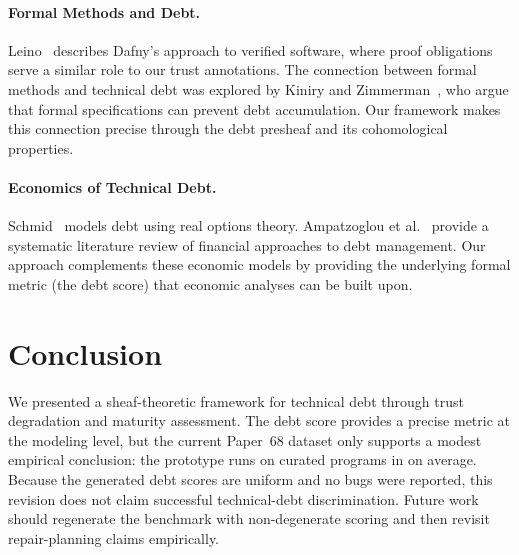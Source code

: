 \documentclass[11pt]{article}
\begin{document}
\paragraph{Formal Methods and Debt.}
Leino~\cite{Leino2010} describes Dafny's approach to verified
software, where proof obligations serve a similar role to our trust
annotations.  The connection between formal methods and technical debt
was explored by Kiniry and Zimmerman~\cite{Kiniry2008}, who argue
that formal specifications can prevent debt accumulation.  Our
framework makes this connection precise through the debt presheaf
and its cohomological properties.

\paragraph{Economics of Technical Debt.}
Schmid~\cite{Schmid2013} models debt using real options theory.
Ampatzoglou et al.~\cite{Ampatzoglou2015} provide a systematic
literature review of financial approaches to debt management.  Our
approach complements these economic models by providing the
underlying formal metric (the debt score) that economic analyses
can be built upon.


\section{Conclusion}\label{sec:conclusion}

We presented a sheaf-theoretic framework for technical debt through
trust degradation and maturity assessment.  The debt score provides
a precise metric at the modeling level, but the current Paper~68 dataset only
supports a modest empirical conclusion: the prototype runs on
\ppLXVIIIprogramCount{} curated programs in \ppLXVIIItimeMean{} on average.
Because the generated debt scores are uniform and no bugs were reported, this
revision does not claim successful technical-debt discrimination. Future work
should regenerate the benchmark with non-degenerate scoring and then revisit
repair-planning claims empirically.
\end{document}

